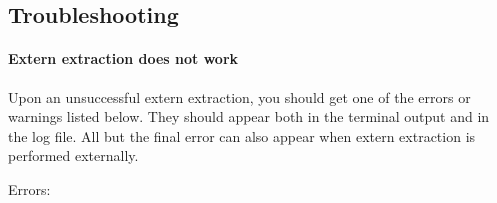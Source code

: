 \documentclass[a4paper,11pt]{article}
\begin{document}
\subsection{Troubleshooting}
\label{sec:troubleshooting}

\paragraph{Extern extraction does not work}
\label{sec:fadings-problem}
\label{sec:loading-order}

Upon an unsuccessful extern extraction, you should get one of the errors or
warnings listed below.  They should appear both in the terminal output and in
the log file.  All but the final error can also appear when extern extraction
is performed externally.


Errors:
\end{document}
